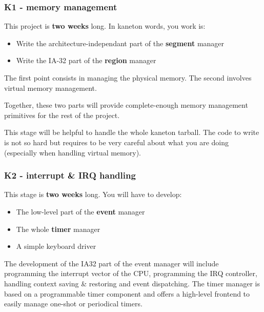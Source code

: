 {%

\begin{frame}
  \frametitle{K1 - memory management}

  This project is \textbf{two weeks} long. In kaneton words, you work is:

  \begin{itemize}
  \item
    Write the architecture-independant part of the \textbf{segment} manager
  \item
    Write the IA-32 part of the \textbf{region} manager
  \end{itemize}

  \-

  The first point consists in managing the physical memory. The second
  involves virtual memory management.

  Together, these two parts will provide complete-enough memory
  management primitives for the rest of the project.

  \-

  This stage will be helpful to handle the whole kaneton tarball. The
  code to write is not so hard but requires to be very careful about
  what you are doing (especially when handling virtual memory).

\end{frame}


\begin{frame}
  \frametitle{K2 - interrupt \& IRQ handling}

  This stage is \textbf{two weeks} long. You will have to develop:

  \begin{itemize}
  \item
    The low-level part of the \textbf{event} manager
  \item
    The whole \textbf{timer} manager
  \item
    A simple keyboard driver
  \end{itemize}

  \-

  The development of the IA32 part of the event manager will include
  programming the interrupt vector of the CPU, programming the IRQ
  controller, handling context saving \& restoring and event
  dispatching. The timer manager is based on a programmable timer
  component and offers a high-level frontend to easily manage one-shot
  or periodical timers.

  \-


\end{frame}}
